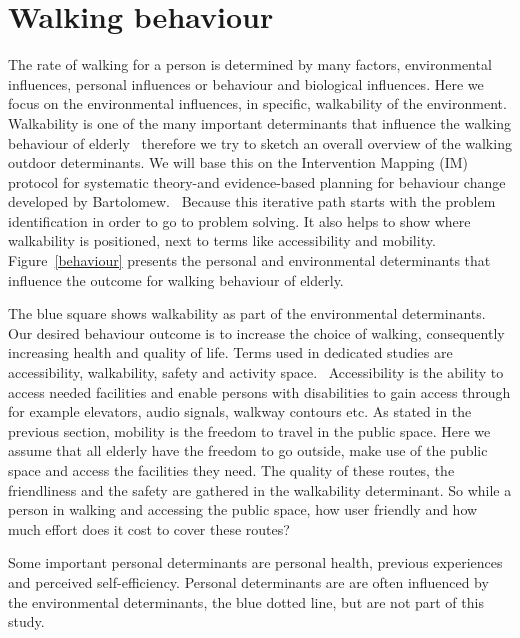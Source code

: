 \section{Walking behaviour}\label{walking}
The rate of walking for a person is determined by many factors, environmental influences, personal influences or behaviour and biological influences. Here we focus on the environmental influences, in specific, walkability of the environment. Walkability is one of the many important determinants that influence the walking behaviour of elderly~\cite{Vine2012} therefore we try to sketch an overall overview of the walking outdoor determinants. We will base this on the Intervention Mapping (IM) protocol for systematic theory-and evidence-based planning for behaviour change developed by Bartolomew.~\cite{Bartholmew2011} Because this iterative path starts with the problem identification in order to go to problem solving. It also helps to show where walkability is positioned, next to terms like accessibility and mobility. Figure~\ref{behaviour} presents the personal and environmental determinants that influence the outcome for walking behaviour of elderly. 

The blue square shows walkability as part of the environmental determinants. Our desired behaviour outcome is to increase the choice of walking, consequently increasing health and quality of life. Terms used in dedicated studies are accessibility, walkability, safety and activity space.~\cite{Vine2012} Accessibility is the ability to access needed facilities and enable persons with disabilities to gain access through for example elevators, audio signals, walkway contours etc. As stated in the previous section, mobility is the freedom to travel in the public space. Here we assume that all elderly have the freedom to go outside, make use of the public space and access the facilities they need. The quality of these routes, the friendliness and the safety are gathered in the walkability determinant. So while a person in walking and accessing the public space, how user friendly and how much effort does it cost to cover these routes?

Some important personal determinants are personal health, previous experiences and perceived self-efficiency. Personal determinants are are often influenced by the environmental determinants, the blue dotted line, but are not part of this study.

